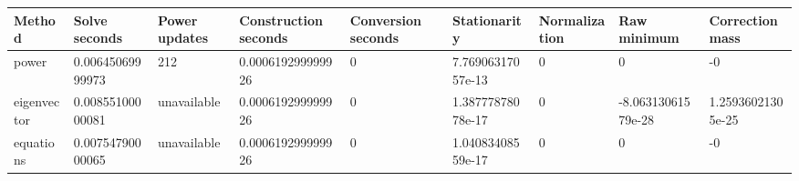 \begin{tabular}{lllllllll}
\hline
Method & Solve seconds & Power updates & Construction seconds & Conversion seconds & Stationarity & Normalization & Raw minimum & Correction mass \\
\hline
power & 0.00645069999973 & 212 & 0.000619299999926 & 0 & 7.76906317057e-13 & 0 & 0 & -0 \\
eigenvector & 0.00855100000081 & unavailable & 0.000619299999926 & 0 & 1.38777878078e-17 & 0 & -8.06313061579e-28 & 1.25936021305e-25 \\
equations & 0.00754790000065 & unavailable & 0.000619299999926 & 0 & 1.04083408559e-17 & 0 & 0 & -0 \\
\hline
\end{tabular}
